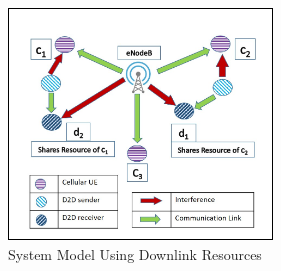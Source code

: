 \documentclass[times]{dacauth}
\begin{document}
\begin{figure}[t]
	{ %
		\setlength{\fboxsep}{1.5pt}%
		\setlength{\fboxrule}{1.5pt}%
		\centering
		\includegraphics[width=70mm]{Graph/System_Model_Downlink.jpg}
		\caption{System Model Using Downlink Resources} \label{fig:system_model}
	}
\end{figure}

%			
\end{document}
